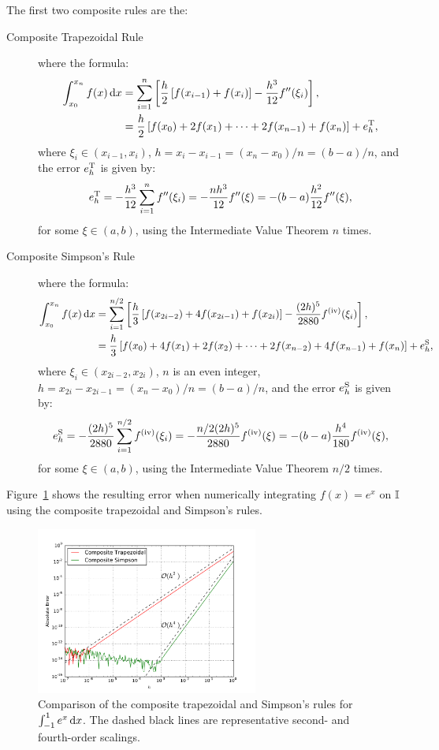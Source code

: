 The first two composite rules are the:
\begin{description}
\item[Composite Trapezoidal Rule] where the formula:
\begin{align*}
\int_{x_0}^{x_n} f(x)\ud x & = \sum_{i=1}^n\left[\dfrac{h}{2}\br[f(x_{i-1})+f(x_i)] - \dfrac{h^3}{12}f''(\xi_i)\right],\\
& = \dfrac{h}{2}\br[f(x_0)+2f(x_1)+\cdots+2f(x_{n-1})+f(x_n)] + e_h^{\rm T},
\end{align*}
where $\xi_i\in(x_{i-1},x_i)$, $h=x_i-x_{i-1} = (x_n-x_0)/n = (b-a)/n$, and the error $e_h^{\rm T}$ is given by:
\[
e_h^{\rm T} = -\dfrac{h^3}{12}\sum_{i=1}^n f''(\xi_i) = -\dfrac{nh^3}{12}f''(\xi) = -(b-a)\dfrac{h^2}{12}f''(\xi),
\]
for some $\xi\in(a,b)$, using the Intermediate Value Theorem $n$ times.
\item[Composite Simpson's Rule] where the formula:
\begin{align*}
\int_{x_0}^{x_n} f(x)\ud x & = \sum_{i=1}^{n/2}\left[\dfrac{h}{3}\br[f(x_{2i-2})+4f(x_{2i-1})+f(x_{2i})] - \dfrac{(2h)^5}{2880}f^{({\rm iv})}(\xi_i)\right],\\
& = \dfrac{h}{3}\br[f(x_0)+4f(x_1)+2f(x_2)+\cdots+2f(x_{n-2})+4f(x_{n-1})+f(x_n)] + e_h^{\rm S},
\end{align*}
where $\xi_i\in(x_{2i-2},x_{2i})$, $n$ is an even integer, $h = x_{2i}-x_{2i-1} = (x_n-x_0)/n = (b-a)/n$, and the error $e_h^{\rm S}$ is given by:
\[
e_h^{\rm S} = -\dfrac{(2h)^5}{2880}\sum_{i=1}^{n/2} f^{({\rm iv})}(\xi_i) = -\dfrac{n/2(2h)^5}{2880}f^{({\rm iv})}(\xi) = -(b-a)\dfrac{h^4}{180}f^{({\rm iv})}(\xi),
\]
for some $\xi\in(a,b)$, using the Intermediate Value Theorem $n/2$ times.
\end{description}

Figure~\ref{figure:CompositeNewtonCotes} shows the resulting error when numerically integrating $f(x) = e^x$ on $\mathbb{I}$ using the composite trapezoidal and Simpson's rules.

\begin{figure}[htbp]
\begin{center}
\includegraphics[width=0.65\textwidth]{compositenewtoncotes}
\caption{Comparison of the composite trapezoidal and Simpson's rules for $\int_{-1}^1e^x{\rm\,d} x$. The dashed black lines are representative second- and fourth-order scalings.}
\label{figure:CompositeNewtonCotes}
\end{center}
\end{figure}

